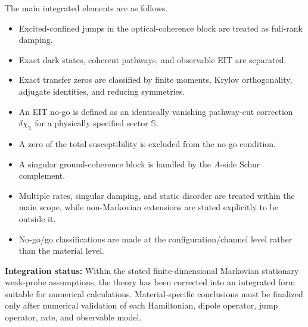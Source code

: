\documentclass[
  10pt,
  a4paper,
]{article}
\providecommand{\tightlist}{%
  \setlength{\itemsep}{0pt}\setlength{\parskip}{0pt}}
\begin{document}
The main integrated elements are as follows.

\begin{itemize}
\tightlist
\item
  Excited-confined jumps in the optical-coherence block are treated as
  full-rank damping.
\item
  Exact dark states, coherent pathways, and observable EIT are
  separated.
\item
  Exact transfer zeros are classified by finite moments, Krylov
  orthogonality, adjugate identities, and reducing symmetries.
\item
  An EIT no-go is defined as an identically vanishing pathway-cut
  correction \(\delta\chi_{\mathbb S}\) for a physically specified
  sector \(\mathbb S\).
\item
  A zero of the total susceptibility is excluded from the no-go
  condition.
\item
  A singular ground-coherence block is handled by the \(A\)-side Schur
  complement.
\item
  Multiple rates, singular damping, and static disorder are treated
  within the main scope, while non-Markovian extensions are stated
  explicitly to be outside it.
\item
  No-go/go classifications are made at the configuration/channel level
  rather than the material level.
\end{itemize}

\textbf{Integration status:} Within the stated finite-dimensional
Markovian stationary weak-probe assumptions, the theory has been
corrected into an integrated form suitable for numerical calculations.
Material-specific conclusions must be finalized only after numerical
validation of each Hamiltonian, dipole operator, jump operator, rate,
and observable model.
\end{document}
